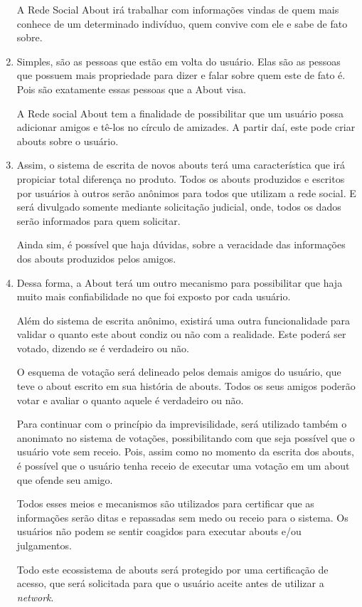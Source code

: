 \begin{enumerate}
        A Rede Social About irá trabalhar com informações vindas de quem mais conhece de um determinado
        indivíduo, quem convive com ele e sabe de fato sobre. 
    \item Simples, são as pessoas que estão em volta do usuário. Elas são as pessoas que possuem mais propriedade para dizer
        e falar sobre quem este de fato é. Pois são exatamente essas pessoas que a About visa.

        A Rede social About tem a finalidade de possibilitar que um usuário possa adicionar amigos  e tê-los no círculo de amizades.
        A partir daí, este pode criar abouts sobre o usuário.

    \item Assim, o sistema de escrita de novos abouts terá uma característica que irá propiciar total diferença
        no produto. Todos os abouts produzidos e escritos por usuários à outros serão anônimos para todos
        que utilizam a rede social. E será divulgado somente mediante solicitação judicial, onde, todos
        os dados serão informados para quem solicitar.


        Ainda sim, é possível que haja dúvidas, sobre a veracidade das informações dos abouts produzidos pelos amigos.

    \item Dessa forma, a About terá um outro mecanismo para possibilitar que haja muito mais confiabilidade no que foi exposto
        por cada usuário.

        Além do sistema de escrita anônimo, existirá uma outra funcionalidade para validar o quanto este about condiz ou não
        com a realidade. Este poderá ser votado, dizendo se é verdadeiro ou não. 

O esquema de votação será delineado pelos demais amigos do usuário, que teve o about escrito em sua história de abouts.
Todos os seus amigos poderão votar e avaliar o quanto aquele é verdadeiro ou não.

Para continuar com o princípio da imprevisilidade, será utilizado também o anonimato no sistema de votações, possibilitando
com que seja possível que o usuário vote sem receio. Pois, assim como no momento da escrita dos abouts, é possível que o 
usuário tenha receio de executar uma votação em um about que ofende seu amigo.

Todos esses meios e mecanismos são utilizados para certificar que as informações serão ditas e repassadas sem medo
ou receio para o sistema. Os usuários não podem se sentir coagidos para executar abouts e/ou julgamentos. 

Todo este ecossistema de abouts será protegido por uma certificação de acesso, que será solicitada para que o usuário
aceite antes de utilizar a \textit{network}.
\end{enumerate}

